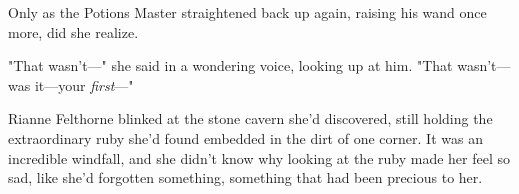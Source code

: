 Only as the Potions Master straightened back up again, raising his wand once
more, did she realize.

"That wasn't—" she said in a wondering voice, looking up at him. "That
wasn't—was it—your \emph{first}—"

Rianne Felthorne blinked at the stone cavern she'd discovered, still holding
the extraordinary ruby she'd found embedded in the dirt of one corner. It was
an incredible windfall, and she didn't know why looking at the ruby made her
feel so sad, like she'd forgotten something, something that had been precious
to her.
